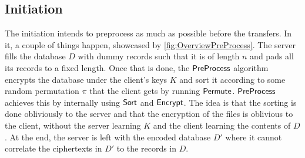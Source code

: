 \subsection*{\thesubsection\quad Initiation}\label{subsec:OverviewInitiation}

The initiation intends to preprocess as much as possible before the transfers. In it, a couple of things happen, showcased by \cref{fig:OverviewPreProcess}. The server fills the database $ D $ with dummy records such that it is of length $ n $ and pads all its records to a fixed length. Once that is done, the $ \mathsf{{PreProcess}} $ algorithm encrypts the database under the client's keys $ K $ and sort it according to some random permutation $ \pi $ that the client gets by running $ \mathsf{{Permute}} $. $ \mathsf{{PreProcess}} $ achieves this by internally using $ \mathsf{{Sort}} $ and $ \mathsf{{Encrypt}} $. The idea is that the sorting is done obliviously to the server and that the encryption of the files is oblivious to the client, without the server learning $ K $ and the client learning the contents of $ D $. At the end, the server is left with the encoded database $ D' $ where it cannot correlate the ciphertexts in $ D' $ to the records in $ D $.

